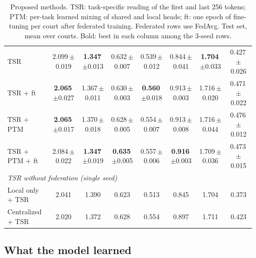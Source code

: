 \begin{table}[H]
\begin{tabular}{l c cc c c cc}
TSR & 2.099\,{\scriptsize$\pm$0.019} & \textbf{1.347}\,{\scriptsize$\pm$0.013} & 0.632\,{\scriptsize$\pm$0.007} & 0.539\,{\scriptsize$\pm$0.012} & 0.844\,{\scriptsize$\pm$0.041} & \textbf{1.704}\,{\scriptsize$\pm$0.033} & 0.427\,{\scriptsize$\pm$0.026} \\
TSR + ft & \textbf{2.065}\,{\scriptsize$\pm$0.027} & 1.367\,{\scriptsize$\pm$0.011} & 0.630\,{\scriptsize$\pm$0.003} & \textbf{0.560}\,{\scriptsize$\pm$0.018} & 0.913\,{\scriptsize$\pm$0.003} & 1.716\,{\scriptsize$\pm$0.020} & 0.471\,{\scriptsize$\pm$0.022} \\
TSR + PTM & \textbf{2.065}\,{\scriptsize$\pm$0.017} & 1.370\,{\scriptsize$\pm$0.018} & 0.628\,{\scriptsize$\pm$0.005} & 0.554\,{\scriptsize$\pm$0.007} & 0.913\,{\scriptsize$\pm$0.008} & 1.716\,{\scriptsize$\pm$0.044} & 0.476\,{\scriptsize$\pm$0.012} \\
TSR + PTM + ft & 2.084\,{\scriptsize$\pm$0.022} & \textbf{1.347}\,{\scriptsize$\pm$0.019} & \textbf{0.635}\,{\scriptsize$\pm$0.005} & 0.557\,{\scriptsize$\pm$0.006} & \textbf{0.916}\,{\scriptsize$\pm$0.003} & 1.709\,{\scriptsize$\pm$0.036} & 0.473\,{\scriptsize$\pm$0.015} \\
\midrule
\multicolumn{8}{l}{\textit{TSR without federation (single seed)}} \\
Local only + TSR & 2.041 & 1.390 & 0.623 & 0.513 & 0.845 & 1.704 & 0.373 \\
Centralized + TSR & 2.020 & 1.372 & 0.628 & 0.554 & 0.897 & 1.711 & 0.423 \\
\bottomrule
\end{tabular}
\caption{Proposed methods. TSR: task-specific reading of the first and last 256 tokens; PTM: per-task learned mixing of shared and local heads; ft: one epoch of fine-tuning per court after federated training. Federated rows use FedAvg. Test set, mean over courts. Bold: best in each column among the 3-seed rows.}
\label{tab:proposed}
\end{table}

\subsection{What the model learned}
